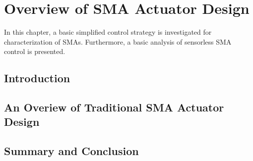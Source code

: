 
\chapter{Overview of SMA Actuator Design}
In this chapter, a basic simplified control strategy is investigated for characterization of SMAs. Furthermore, a basic analysis of sensorless SMA control is presented.
\section{Introduction}

\section{An Overiew of Traditional SMA Actuator Design}
\section{Summary and Conclusion}
